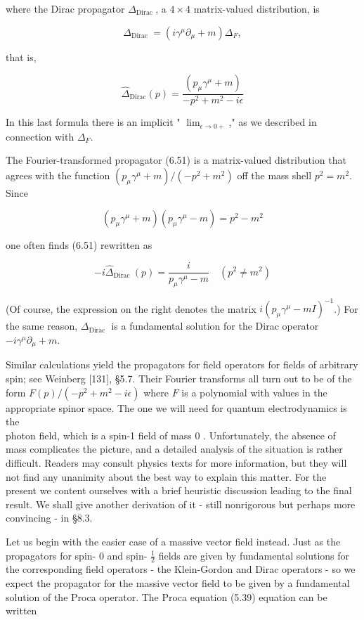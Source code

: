 \documentclass[10pt, letterpaper]{article}
\begin{document}
where the Dirac propagator $\Delta_{\text {Dirac }}$, a $4 \times 4$ matrix-valued distribution, is

$$
\Delta_{\text {Dirac }}=\left(i \gamma^{\mu} \partial_{\mu}+m\right) \Delta_{F},
$$

that is,

$$
\widehat{\Delta}_{\mathrm{Dirac}}(p)=\frac{\left(p_{\mu} \gamma^{\mu}+m\right)}{-p^{2}+m^{2}-i \epsilon}
$$

In this last formula there is an implicit " $\lim _{\epsilon \rightarrow 0+}$," as we described in connection with $\Delta_{F}$.

The Fourier-transformed propagator (6.51) is a matrix-valued distribution that agrees with the function $\left(p_{\mu} \gamma^{\mu}+m\right) /\left(-p^{2}+m^{2}\right)$ off the mass shell $p^{2}=m^{2}$. Since

$$
\left(p_{\mu} \gamma^{\mu}+m\right)\left(p_{\mu} \gamma^{\mu}-m\right)=p^{2}-m^{2}
$$

one often finds (6.51) rewritten as

$$
-i \widehat{\Delta}_{\text {Dirac }}(p)=\frac{i}{p_{\mu} \gamma^{\mu}-m} \quad\left(p^{2} \neq m^{2}\right)
$$

(Of course, the expression on the right denotes the matrix $i\left(p_{\mu} \gamma^{\mu}-m I\right)^{-1}$.) For the same reason, $\Delta_{\text {Dirac }}$ is a fundamental solution for the Dirac operator $-i \gamma^{\mu} \partial_{\mu}+m$.

Similar calculations yield the propagators for field operators for fields of arbitrary spin; see Weinberg [131], §5.7. Their Fourier transforms all turn out to be of the form $F(p) /\left(-p^{2}+m^{2}-i \epsilon\right)$ where $F$ is a polynomial with values in the appropriate spinor space. The one we will need for quantum electrodynamics is the\\
photon field, which is a spin-1 field of mass 0 . Unfortunately, the absence of mass complicates the picture, and a detailed analysis of the situation is rather difficult. Readers may consult physics texts for more information, but they will not find any unanimity about the best way to explain this matter. For the present we content ourselves with a brief heuristic discussion leading to the final result. We shall give another derivation of it - still nonrigorous but perhaps more convincing - in §8.3.

Let us begin with the easier case of a massive vector field instead. Just as the propagators for spin- 0 and spin- $\frac{1}{2}$ fields are given by fundamental solutions for the corresponding field operators - the Klein-Gordon and Dirac operators - so we expect the propagator for the massive vector field to be given by a fundamental solution of the Proca operator. The Proca equation (5.39) equation can be written
\end{document}

